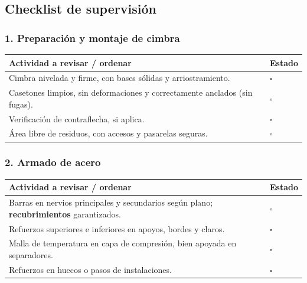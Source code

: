 \documentclass[12pt]{article}
\newcommand{\cbox}{\(\square\)}
\renewcommand{\cbox}{\(\square\)} %
\begin{document}
 \subsection{Checklist de supervisión}
 
 \subsubsection*{1. Preparación y montaje de cimbra}
 \begin{tabularx}{\linewidth}{>{\raggedright\arraybackslash}p{0.93\linewidth} >{\centering\arraybackslash}m{0.07\linewidth}}
 	\toprule
 	\textbf{Actividad a revisar / ordenar} & \textbf{Estado}\\
 	\midrule
 	Cimbra nivelada y firme, con bases sólidas y arriostramiento. & \cbox \\
 	Casetones limpios, sin deformaciones y correctamente anclados (sin fugas). & \cbox \\
 	Verificación de contraflecha, si aplica. & \cbox \\
 	Área libre de residuos, con accesos y pasarelas seguras. & \cbox \\
 	\bottomrule
 \end{tabularx}
 
 \subsubsection*{2. Armado de acero}
 \begin{tabularx}{\linewidth}{>{\raggedright\arraybackslash}p{0.93\linewidth} >{\centering\arraybackslash}m{0.07\linewidth}}
 	\toprule
 	\textbf{Actividad a revisar / ordenar} & \textbf{Estado}\\
 	\midrule
 	Barras en nervios principales y secundarios según plano; \textbf{recubrimientos} garantizados. & \cbox \\
 	Refuerzos superiores e inferiores en apoyos, bordes y claros. & \cbox \\
 	Malla de temperatura en capa de compresión, bien apoyada en separadores. & \cbox \\
 	Refuerzos en huecos o pasos de instalaciones. & \cbox \\
 	\bottomrule
 \end{tabularx}
 
\end{document}
